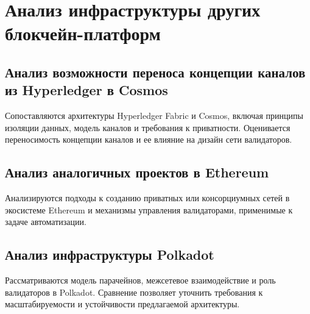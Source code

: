 \chapter{Анализ инфраструктуры других блокчейн-платформ}\label{ch:ch3}

\section{Анализ возможности переноса концепции каналов из Hyperledger в Cosmos}\label{sec:ch3/sec1}

Сопоставляются архитектуры Hyperledger Fabric и Cosmos, включая принципы
изоляции данных, модель каналов и требования к приватности. Оценивается
переносимость концепции каналов и ее влияние на дизайн сети валидаторов.

\section{Анализ аналогичных проектов в Ethereum}\label{sec:ch3/sec2}

Анализируются подходы к созданию приватных или консорциумных сетей в экосистеме
Ethereum и механизмы управления валидаторами, применимые к задаче автоматизации.

\section{Анализ инфраструктуры Polkadot}\label{sec:ch3/sec3}

Рассматриваются модель парачейнов, межсетевое взаимодействие и роль валидаторов в
Polkadot. Сравнение позволяет уточнить требования к масштабируемости и
устойчивости предлагаемой архитектуры.
